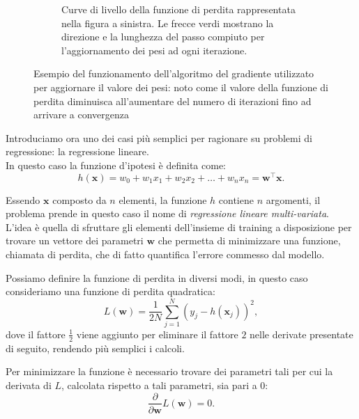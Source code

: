 \documentclass[../../main.tex]{subfiles}
\begin{document}
\begin{figure}[H]
\begin{subfigure}[t]{0.49\textwidth}
            \caption{Curve di livello della funzione di perdita rappresentata nella figura a sinistra. Le frecce verdi mostrano la direzione e la lunghezza del passo compiuto per l'aggiornamento dei pesi ad ogni iterazione.}
            \label{fig:curveLivello}      
        \end{subfigure}
        \caption{Esempio del funzionamento dell'algoritmo del gradiente utilizzato per aggiornare il valore dei pesi: noto come il valore della funzione di perdita diminuisca all'aumentare del numero di iterazioni fino ad arrivare a convergenza}
        \label{fig:gradient_descent}
    \end{figure}

    Introduciamo ora uno dei casi più semplici per ragionare su problemi di regressione: la regressione lineare.\\
    In questo caso la funzione d'ipotesi è definita come:
    \begin{equation}
        h(\boldsymbol{x}) = w_0 + w_1x_1 + w_2x_2 + \dots + w_nx_n = \boldsymbol{w}^\top \boldsymbol{x}.
        \label{eqn:linearhypotes}   
    \end{equation}

    Essendo $\boldsymbol{x}$  composto da $n$ elementi, la funzione $h$ contiene $n$ argomenti, il problema prende in questo caso il nome di \textit{regressione lineare multi-variata}. L'idea è quella di sfruttare gli elementi dell'insieme di training a disposizione per trovare un vettore dei parametri $\boldsymbol{w}$ che permetta di minimizzare  una funzione, chiamata di perdita, che di fatto quantifica l'errore commesso dal modello.
    
    Possiamo definire la funzione di perdita in diversi modi, in questo caso consideriamo una funzione di perdita quadratica:
    \begin{equation}
        L(\boldsymbol{w}) = \frac{1}{2N} \sum_{j=1}^N(y_j - h(\boldsymbol{x}_j))^2,
        \label{eqn:lossquadratica}
    \end{equation}
    dove il fattore $\frac{1}{2}$ viene aggiunto per eliminare il fattore $2$ nelle derivate presentate di seguito, rendendo più semplici i calcoli.

    Per minimizzare la funzione è necessario trovare dei parametri tali per cui la derivata di $L$, calcolata rispetto a tali parametri, sia pari a 0:
    \[\frac{\partial}{\partial \boldsymbol{w}} L(\boldsymbol{w}) = 0.\]
\end{document}
